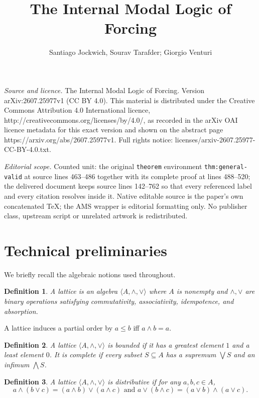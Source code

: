 \documentclass[10pt,a4paper]{amsart}
\newtheorem{definition}{Definition}[section]
\begin{document}
\title[The Internal Modal Logic of Forcing]{The Internal Modal Logic of Forcing}
\author{Santiago Jockwich, Sourav Tarafder; Giorgio Venturi}
\date{}
\maketitle
\noindent\emph{Source and licence.} The Internal Modal Logic of Forcing. Version arXiv:2607.25977v1 (CC BY 4.0). This material is distributed under the Creative Commons Attribution 4.0 International licence, http://creativecommons.org/licenses/by/4.0/, as recorded in the arXiv OAI licence metadata for this exact version and shown on the abstract page https://arxiv.org/abs/2607.25977v1. Full rights notice: licenses/arxiv-2607.25977-CC-BY-4.0.txt.\par\smallskip
\noindent\textit{Editorial scope.} Counted unit: the original \texttt{theorem} environment \texttt{thm:general-valid} at source lines 463--486 together with its complete proof at lines 488--520; the delivered document keeps source lines 142--762 so that every referenced label and every citation resolves inside it. Native editable source is the paper's own concatenated TeX; the AMS wrapper is editorial formatting only. No publisher class, upstream script or unrelated artwork is redistributed.
\section{Technical preliminaries}

We briefly recall the algebraic notions used throughout.

\begin{definition}
A \emph{lattice} is an algebra $\langle A,\wedge,\vee\rangle$ where $A$ is nonempty and
$\wedge,\vee$ are binary operations satisfying commutativity, associativity, idempotence, and
absorption.
\end{definition}

A lattice induces a partial order by $a\le b$ iff $a\wedge b=a$.

\begin{definition}
A lattice $\langle A,\wedge,\vee\rangle$ is \emph{bounded} if it has a greatest element $1$ and
a least element $0$. It is \emph{complete} if every subset $S\subseteq A$ has a supremum $\bigvee S$ and an infimum $\bigwedge S$.
\end{definition}

\begin{definition}
A lattice $\langle A,\wedge,\vee\rangle$ is \emph{distributive} if for any $a, b, c \in A$,
\[a \wedge (b \vee c) = (a \wedge b) \vee (a \wedge c) \mbox{ and } a \vee (b \wedge c) = (a \vee b) \wedge (a \vee c).\]
\end{definition}
\end{document}

